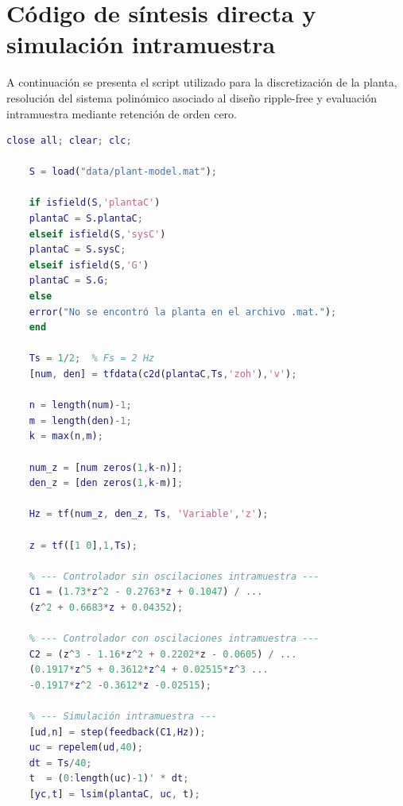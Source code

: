 \section{Código de síntesis directa y simulación intramuestra}
\label{ap:codigo_TR}

A continuación se presenta el script utilizado para la
discretización de la planta, resolución del sistema
polinómico asociado al diseño ripple-free y evaluación
intramuestra mediante retención de orden cero.

\begin{lstlisting}[language=Matlab]
	close all; clear; clc;
	
	S = load("data/plant-model.mat");
	
	if isfield(S,'plantaC')
	plantaC = S.plantaC;
	elseif isfield(S,'sysC')
	plantaC = S.sysC;
	elseif isfield(S,'G')
	plantaC = S.G;
	else
	error("No se encontró la planta en el archivo .mat.");
	end
	
	Ts = 1/2;  % Fs = 2 Hz
	[num, den] = tfdata(c2d(plantaC,Ts,'zoh'),'v');
	
	n = length(num)-1;
	m = length(den)-1;
	k = max(n,m);
	
	num_z = [num zeros(1,k-n)];
	den_z = [den zeros(1,k-m)];
	
	Hz = tf(num_z, den_z, Ts, 'Variable','z');
	
	z = tf([1 0],1,Ts);
	
	% --- Controlador sin oscilaciones intramuestra ---
	C1 = (1.73*z^2 - 0.2763*z + 0.1047) / ...
	(z^2 + 0.6683*z + 0.04352);
	
	% --- Controlador con oscilaciones intramuestra ---
	C2 = (z^3 - 1.16*z^2 + 0.2202*z - 0.0605) / ...
	(0.1917*z^5 + 0.3612*z^4 + 0.02515*z^3 ...
	-0.1917*z^2 -0.3612*z -0.02515);
	
	% --- Simulación intramuestra ---
	[ud,n] = step(feedback(C1,Hz));
	uc = repelem(ud,40);
	dt = Ts/40;
	t  = (0:length(uc)-1)' * dt;
	[yc,t] = lsim(plantaC, uc, t);
\end{lstlisting}
